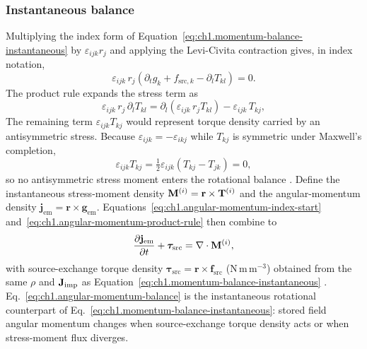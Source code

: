 \subsubsection*{Instantaneous balance} Multiplying the index form of Equation~\eqref{eq:ch1.momentum-balance-instantaneous} by $\varepsilon_{ijk}r_j$ and applying the Levi-Civita contraction gives, in index notation,
\begin{equation}
\label{eq:ch1.angular-momentum-index-start}
\varepsilon_{ijk}\,r_j\!\left(\partial_t g_k+f_{\mathrm{src},k}-\partial_l T_{kl}\right)
=0.
\end{equation}
The product rule expands the stress term as
\begin{equation}
\label{eq:ch1.angular-momentum-product-rule}
\varepsilon_{ijk}\,r_j\,\partial_l T_{kl}
=\partial_l\!\left(\varepsilon_{ijk}\,r_j T_{kl}\right)
-\varepsilon_{ijk}\,T_{kj},
\end{equation}
The remaining term $\varepsilon_{ijk}T_{kj}$ would represent torque density carried by an antisymmetric stress. Because $\varepsilon_{ijk}=-\varepsilon_{ikj}$ while $T_{kj}$ is symmetric under Maxwell's completion,
\begin{equation}
\label{eq:ch1.stress-symmetry-torque-vanish}
\varepsilon_{ijk}T_{kj}=\tfrac12\varepsilon_{ijk}(T_{kj}-T_{jk})=0,
\end{equation}
so no antisymmetric stress moment enters the rotational balance \cite{maxwell1873,stratton1941,harrington2001}. Define the instantaneous stress-moment density $\mathbf{M}^{(i)}=\mathbf{r}\times\mathbf{T}^{(i)}$ and the angular-momentum density $\mathbf{j}_{\mathrm{em}}=\mathbf{r}\times\mathbf{g}_{\mathrm{em}}$. Equations~\eqref{eq:ch1.angular-momentum-index-start} and~\eqref{eq:ch1.angular-momentum-product-rule} then combine to
\begin{equation}
\label{eq:ch1.angular-momentum-balance}
\frac{\partial\mathbf{j}_{\mathrm{em}}}{\partial t}+\boldsymbol{\tau}_{\mathrm{src}}
=\nabla\cdot\mathbf{M}^{(i)},
\end{equation}
with source-exchange torque density $\boldsymbol{\tau}_{\mathrm{src}}=\mathbf{r}\times\mathbf{f}_{\mathrm{src}}$ (N\,m\,m$^{-3}$) obtained from the same $\rho$ and $\mathbf{J}_{\mathrm{imp}}$ as Equation~\eqref{eq:ch1.momentum-balance-instantaneous} \cite{maxwell1873,stratton1941}. Eq.~\eqref{eq:ch1.angular-momentum-balance} is the instantaneous rotational counterpart of Eq.~\eqref{eq:ch1.momentum-balance-instantaneous}: stored field angular momentum changes when source-exchange torque density acts or when stress-moment flux diverges.

